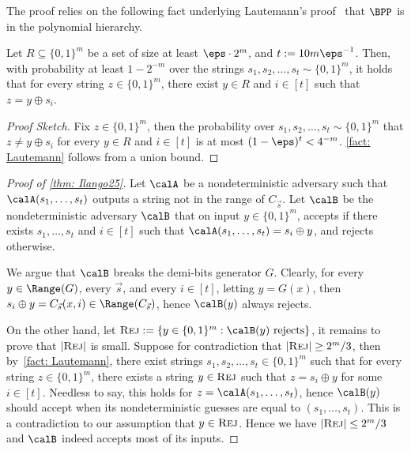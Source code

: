 The proof relies on the following fact underlying Lautemann's proof~\cite{Lautemann83} that $\BPP$ is in the polynomial hierarchy.
\begin{fact}\label{fact: Lautemann}
    Let $R\subseteq \{0, 1\}^m$ be a set of size at least $\eps \cdot 2^m$, and $t := 10m\eps^{-1}$. Then, with probability at least $1-2^{-m}$ over the strings $s_1, s_2, \dots, s_t \sim \{0, 1\}^m$, it holds that for every string $z\in\{0, 1\}^m$, there exist $y\in R$ and $i\in[t]$ such that $z = y \oplus s_i$.
\end{fact}
\begin{proof}[Proof Sketch]
    Fix $z\in \{0, 1\}^m$, then the probability over $s_1, s_2, \dots, s_t\sim\{0, 1\}^m$ that $z\ne y\oplus s_i$ for every $y\in R$ and $i\in [t]$ is at most $(1-\eps)^t < 4^{-m}$. \autoref{fact: Lautemann} follows from a union bound.
\end{proof}

\def\Rej{\textsc{Rej}}
\begin{proof}[Proof of \autoref{thm: Ilango25}]
    Let $\calA$ be a nondeterministic adversary such that $\calA(s_1, \dots, s_t)$ outputs a string not in the range of $C_{\vec{s}}$. Let $\calB$ be the nondeterministic adversary $\calB$ that on input $y \in \{0, 1\}^m$, accepts if there exists $s_1, \dots, s_t$ and $i\in [t]$ such that $\calA(s_1, \dots, s_t) = s_i \oplus y$, and rejects otherwise. 
    
    We argue that $\calB$ breaks the demi-bits generator $G$. Clearly, for every $y\in \Range(G)$, every $\vec{s}$, and every $i\in[t]$, letting $y = G(x)$, then $s_i\oplus y = C_{\vec{s}}(x, i) \in \Range(C_{\vec{s}})$, hence $\calB(y)$ always rejects.

    On the other hand, let $\Rej := \{y \in \{0, 1\}^m: \calB(y)\text{ rejects}\}$, it remains to prove that $|\Rej|$ is small. Suppose for contradiction that $|\Rej| \ge 2^m / 3$, then by~\autoref{fact: Lautemann}, there exist strings $s_1, s_2, \dots, s_t \in \{0, 1\}^m$ such that for every string $z \in \{0, 1\}^m$, there exists a string $y \in \Rej$ such that $z = s_i\oplus y$ for some $i\in [t]$. Needless to say, this holds for $z = \calA(s_1, \dots, s_t)$, hence $\calB(y)$ should accept when its nondeterministic guesses are equal to $(s_1, \dots, s_t)$. This is a contradiction to our assumption that $y \in \Rej$. Hence we have $|\Rej| \le 2^m/3$ and $\calB$ indeed accepts most of its inputs.
\end{proof}





